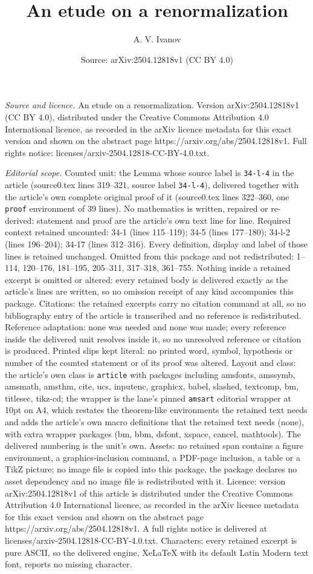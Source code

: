\documentclass[10pt,a4paper]{amsart}
\title[An etude on a renormalization]{An etude on a renormalization}
\author{A. V. Ivanov}
\date{Source: arXiv:2504.12818v1 (CC BY 4.0)}
\begin{document}
\maketitle

\noindent\emph{Source and licence.} An etude on a renormalization. Version arXiv:2504.12818v1 (CC BY 4.0), distributed under the Creative Commons Attribution 4.0 International licence, as recorded in the arXiv licence metadata for this exact version and shown on the abstract page https://arxiv.org/abs/2504.12818v1. Full rights notice: licenses/arxiv-2504.12818-CC-BY-4.0.txt.\par\smallskip

\noindent\textit{Editorial scope.} Counted unit: the Lemma whose source label is \texttt{34-l-4} in the article (source0.tex lines 319--321, source label \texttt{34-l-4}), delivered together with the article's own complete original proof of it (source0.tex lines 322--360, one \texttt{proof} environment of 39 lines). No mathematics is written, repaired or re-derived: statement and proof are the article's own text line for line. Required context retained uncounted: 34-1 (lines 115--119); 34-5 (lines 177--180); 34-l-2 (lines 196--204); 34-17 (lines 312--316). Every definition, display and label of those lines is retained unchanged. Omitted from this package and not redistributed: 1--114, 120--176, 181--195, 205--311, 317--318, 361--755. Nothing inside a retained excerpt is omitted or altered: every retained body is delivered exactly as the article's lines are written, so no omission receipt of any kind accompanies this package. Citations: the retained excerpts carry no citation command at all, so no bibliography entry of the article is transcribed and no reference is redistributed. Reference adaptation: none was needed and none was made; every reference inside the delivered unit resolves inside it, so no unresolved reference or citation is produced. Printed slips kept literal: no printed word, symbol, hypothesis or number of the counted statement or of its proof was altered. Layout and class: the article's own class is \texttt{article} with packages including amsfonts, amssymb, amsmath, amsthm, cite, ucs, inputenc, graphicx, babel, slashed, textcomp, bm, titlesec, tikz-cd; the wrapper is the lane's pinned \texttt{amsart} editorial wrapper at 10pt on A4, which restates the theorem-like environments the retained text needs and adds the article's own macro definitions that the retained text needs (none), with extra wrapper packages (bm, bbm, dsfont, xspace, cancel, mathtools). The delivered numbering is the unit's own. Assets: no retained span contains a figure environment, a graphics-inclusion command, a PDF-page inclusion, a table or a TikZ picture; no image file is copied into this package, the package declares no asset dependency and no image file is redistributed with it. Licence: version arXiv:2504.12818v1 of this article is distributed under the Creative Commons Attribution 4.0 International licence, as recorded in the arXiv licence metadata for this exact version and shown on the abstract page https://arxiv.org/abs/2504.12818v1. A full rights notice is delivered at licenses/arxiv-2504.12818-CC-BY-4.0.txt. Characters: every retained excerpt is pure ASCII, so the delivered engine, XeLaTeX with its default Latin Modern text font, reports no missing character.
\end{document}
